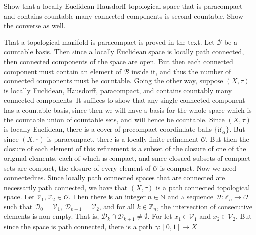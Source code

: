 \documentclass{article}                                                        %
\begin{document}
        \begin{problem}
            Show that a locally Euclidean Hausdorff topological space that is
            paracompact and contains countable many connected components is
            second countable. Show the converse as well.
        \end{problem}
        \begin{solution}
            That a topological manifold is paracompact is proved in the text. Let
            $\mathcal{B}$ be a countable basis. Then since a locally Euclidean space
            is locally path connected, then connected components of the space are
            open. But then each connected component must contain an element of
            $\mathcal{B}$ inside it, and thus the number of connected components
            must be countable. Going the other way, suppose $(X,\tau)$ is locally
            Euclidean, Hausdorff, paracompact, and contains countably many
            connected components. It suffices to show that any single connected
            component has a countable basis, since then we will have a basis for the
            whole space which is the countable union of countable sets, and will
            hence be countable. Since $(X,\tau)$ is locally Euclidean, there is a
            cover of precompact coordindate balls $\{\mathcal{U}_{\alpha}\}$. But
            since $(X,\tau)$ is paracompact, there is a locally finite refinement
            $\mathcal{O}$. But then the closure of each element of this refinement
            is a subset of the closure of one of the original elements, each of
            which is compact, and since closued subsets of compact sets are compact,
            the closure of every element of $\mathcal{O}$ is compact. Now we need
            connectednes. Since locally path connected spaces that are connected are
            necessarily path connected, we have that $(X,\tau)$ is a path connected
            topological space. Let $\mathcal{V}_{1},\mathcal{V}_{2}\in\mathcal{O}$.
            Then there is an integer $n\in\mathbb{N}$ and a sequence
            $\mathcal{D}:\mathbb{Z}_{n}\rightarrow\mathcal{O}$ such that
            $\mathcal{D}_{0}=\mathcal{V}_{1}$, $\mathcal{D}_{n-1}=\mathcal{V}_{2}$,
            and for all $k\in\mathbb{Z}_{n}$, the intersection of consecutive
            elements is non-empty. That is,
            $\mathcal{D}_{k}\cap\mathcal{D}_{k+1}\ne\emptyset$. For let
            $x_{1}\in\mathcal{V}_{1}$ and $x_{2}\in\mathcal{V}_{2}$. But since the
            space is path connected, there is a path $\gamma:[0,1]\rightarrow{X}$

\end{solution}
\end{document}
